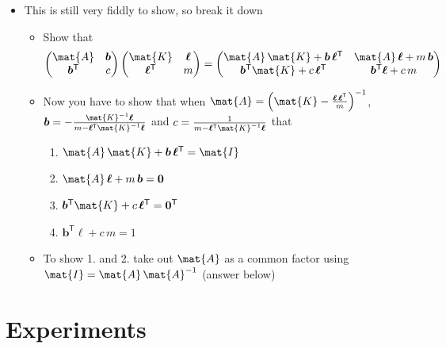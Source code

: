 \documentclass[11pt]{article}
\newcommand{\tr}{\textsf{T}}
\newcommand{\vl}{\bm{\ell}}
\newcommand{\vb}{\bm{b}}
\begin{document}
\begin{itemize}
\begin{itemize}
\item This is still very fiddly to show, so break it down
\begin{itemize}
\item Show that
$$ \begin{pmatrix} \mat{A} & \vb \\ \vb^\tr & c \end{pmatrix}
	 \begin{pmatrix} \mat{K} & \vl \\ \vl^\tr & m \end{pmatrix} =
	 \begin{pmatrix} \mat{A}\,\mat{K} + \vb\,\vl^\tr &
         \mat{A}\,\vl + m\,\vb \\ 
         \vb^\tr\mat{K} + c\,\vl^\tr & \vb^\tr \vl + c\,m \end{pmatrix} $$
\item Now you have to show that when \(\mat{A} = 
         \left(\mat{K}-\frac{\vl\,\vl^\tr}{m}\right)^{-1}\),
\(\vb=-\frac{\mat{K}^{-1} \vl}{m-\vl^\tr \mat{K}^{-1}\vl}\)
and \(c=\frac{1}{m-\vl^\tr \mat{K}^{-1}\vl}\) that
\begin{enumerate}
\item \(\mat{A}\,\mat{K} + \vb\,\vl^\tr = \mat{I}\)
\item \(\mat{A}\,\vl + m\,\vb = \bm{0}\)
\item \(\vb^\tr\mat{K} + c\,\vl^\tr = \bm{0}^\tr\)
\item \(\vb^\tr \vl + c\,m = 1\)
\end{enumerate}
\item To show 1. and 2. take out \(\mat{A}\) as a common factor using
\(\mat{I}=\mat{A}\,\mat{A}^{-1}\) (answer below)
\end{itemize}
\end{itemize}
\end{itemize}
\section{Experiments}
\label{sec:orgdef6fc5}
\end{document}
